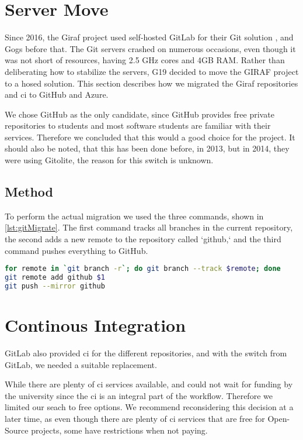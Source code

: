 \label{sec:GitAndCI} \section{Server Move}

Since 2016\cite{SW611F16}, the Giraf project used self-hosted GitLab for their Git solution , and Gogs before that\cite{SW603F15}. The Git servers crashed on numerous occasions, even though it was not short of resources, having 2.5 GHz cores and 4GB RAM. Rather than deliberating how to stabilize the servers, \gls{G19} decided to move the GIRAF project to a hosed solution. This section describes how we migrated the Giraf repositories and \gls{ci} to GitHub and Azure.

We chose GitHub as the only candidate, since GitHub provides free private repositories to students and most software students are familiar with their services. Therefore we concluded that this would a good choice for the project. It should also be noted, that this has been done before, in 2013\cite{SW601F13}, but in 2014, they were using Gitolite\cite{SW613F14}, the reason for this switch is unknown.

\subsection{Method}

To perform the actual migration we used the three commands, shown in \autoref{lst:gitMigrate}. The first command tracks all branches in the current repository, the second adds a new remote to the repository called `github,` and the third command pushes everything to GitHub.

\begin{lstlisting}[language=bash,label={lst:gitMigrate},caption={Git Migration code}]
for remote in `git branch -r`; do git branch --track $remote; done
git remote add github $1
git push --mirror github
\end{lstlisting}

\section{Continous Integration}

GitLab also provided \gls{ci} for the different repositories, and with the switch from GitLab, we needed a suitable replacement.

While there are plenty of \gls{ci} services available, and could not wait for funding by the university since the \gls{ci} is an integral part of the workflow. Therefore we limited our seach to free options.  We recommend reconsidering this decision at a later time, as even though there are plenty of \gls{ci} services that are free for Open-Source projects, some have restrictions when not paying.


